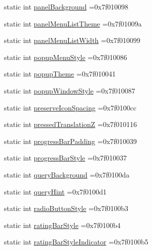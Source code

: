 \begin{DoxyCompactItemize}
static int \hyperlink{classandroid_1_1support_1_1v4_1_1R_1_1attr_a7dd979fca50e7d1b3cf5eb905807904d}{panel\+Background} =0x7f010098
\item 
static int \hyperlink{classandroid_1_1support_1_1v4_1_1R_1_1attr_a6ba4776dc756edf67526363c1d87c269}{panel\+Menu\+List\+Theme} =0x7f01009a
\item 
static int \hyperlink{classandroid_1_1support_1_1v4_1_1R_1_1attr_a9c5fc64ccd77f01ff944d1df2fcc080c}{panel\+Menu\+List\+Width} =0x7f010099
\item 
static int \hyperlink{classandroid_1_1support_1_1v4_1_1R_1_1attr_a10740d726841b1c76173ce62b853748a}{popup\+Menu\+Style} =0x7f010086
\item 
static int \hyperlink{classandroid_1_1support_1_1v4_1_1R_1_1attr_a05446418402decb6877749b6de8bc2d8}{popup\+Theme} =0x7f010041
\item 
static int \hyperlink{classandroid_1_1support_1_1v4_1_1R_1_1attr_a4927a489f5738a700c74abb08ce2efd0}{popup\+Window\+Style} =0x7f010087
\item 
static int \hyperlink{classandroid_1_1support_1_1v4_1_1R_1_1attr_ae2c236de8d06fbd2175fc1c3631a8073}{preserve\+Icon\+Spacing} =0x7f0100cc
\item 
static int \hyperlink{classandroid_1_1support_1_1v4_1_1R_1_1attr_ab422cdde74a71733904ec36f3451d234}{pressed\+TranslationZ} =0x7f010116
\item 
static int \hyperlink{classandroid_1_1support_1_1v4_1_1R_1_1attr_a2f33b6b0b1c10888283153513a2d5f7b}{progress\+Bar\+Padding} =0x7f010039
\item 
static int \hyperlink{classandroid_1_1support_1_1v4_1_1R_1_1attr_a825836d37f82a837d7db265bcefa17d8}{progress\+Bar\+Style} =0x7f010037
\item 
static int \hyperlink{classandroid_1_1support_1_1v4_1_1R_1_1attr_abb883f55c9e18decf486d36cde924bbd}{query\+Background} =0x7f0100da
\item 
static int \hyperlink{classandroid_1_1support_1_1v4_1_1R_1_1attr_a3cf01285970a5ede012ca1d4e7982643}{query\+Hint} =0x7f0100d1
\item 
static int \hyperlink{classandroid_1_1support_1_1v4_1_1R_1_1attr_a3a741ae2c60e3e084c070a7d57e55f6b}{radio\+Button\+Style} =0x7f0100b3
\item 
static int \hyperlink{classandroid_1_1support_1_1v4_1_1R_1_1attr_aba190d638db09f1bd63f84b321dcd510}{rating\+Bar\+Style} =0x7f0100b4
\item 
static int \hyperlink{classandroid_1_1support_1_1v4_1_1R_1_1attr_a0c3270465c677567d768450904e74941}{rating\+Bar\+Style\+Indicator} =0x7f0100b5

\end{DoxyCompactItemize}
